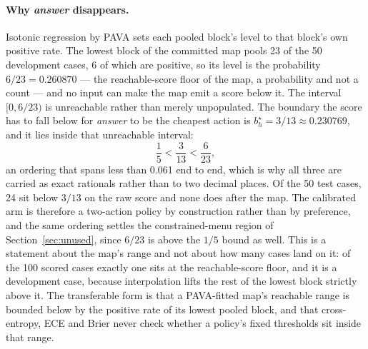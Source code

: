 \documentclass{article}
\begin{document}
\paragraph{Why \emph{answer} disappears.}
Isotonic regression by PAVA sets each pooled block's level to that block's own
positive rate. The lowest block of the committed map pools 23 of the 50 development
cases, 6 of which are positive, so its level is the probability
$6/23 = 0.260870$ --- the reachable-score floor of the map, a probability and not a
count --- and no input can make the map emit a score below it. The interval
$[0, 6/23)$ is unreachable rather than merely unpopulated. The boundary the score
has to fall below for \emph{answer} to be the cheapest action is
$b_h^{\star} = 3/13 \approx 0.230769$, and it lies inside that unreachable
interval:
\begin{equation}
\frac{1}{5} < \frac{3}{13} < \frac{6}{23} ,
\end{equation}
an ordering that spans less than 0.061 end to end, which is why all three are
carried as exact rationals rather than to two decimal places. Of the 50 test
cases, 24 sit below $3/13$ on the raw score and none does after the map. The
calibrated arm is therefore a two-action policy by construction rather than by
preference, and the same ordering settles the constrained-menu region of
Section~\ref{sec:unused}, since $6/23$ is above the $1/5$ bound as well. This is a
statement about the map's range and not about how many cases land on it: of the 100
scored cases exactly one sits at the reachable-score floor, and it is a development
case, because interpolation lifts the rest of the lowest block strictly above it.
The transferable form is that a PAVA-fitted
map's reachable range is bounded below by the positive rate of its lowest pooled
block, and that cross-entropy, ECE and Brier never check whether a policy's fixed
thresholds sit inside that range.
\end{document}
